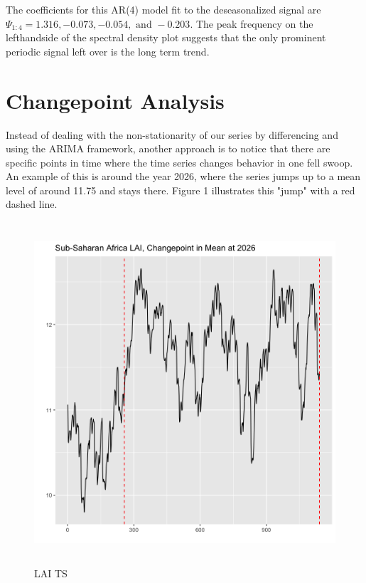 \documentclass[11pt]{article}
\begin{document}
The coefficients for this AR(4) model fit to the deseasonalized signal are
$\Psi_{1:4} = 1.316, -0.073, -0.054, \textrm{ and } -0.203$. The peak
frequency on the lefthandside of the spectral density plot suggests that the
only prominent periodic signal left over is the long term trend.

\section{Changepoint Analysis}

Instead of dealing with the non-stationarity of our series by differencing and using the ARIMA framework, another approach is to notice that there are specific points in time where the time series changes behavior in one fell swoop. An example of this is around the year 2026, where the series jumps up to a mean level of around 11.75 and stays there. Figure 1 illustrates this "jump" with a red dashed line.
\begin{figure}[h!]
	\centering
	\includegraphics[width=5in, height=5in]{../img/changepoint_LAI.png}
	\caption{LAI TS}
\end{figure}
\end{document}
